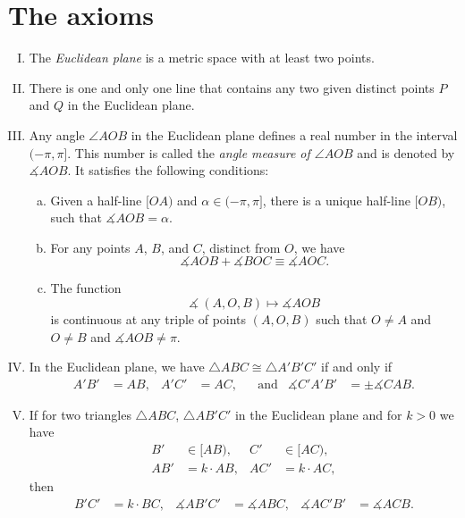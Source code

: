 \newpage

\section{The axioms}
\label{sec:axioms}


\begin{framed}
\begin{enumerate}[I.]
\item\label{def:birkhoff-axioms:0} The \emph{Euclidean plane} is a metric space with at least two points.


\item\label{def:birkhoff-axioms:1} 
There is one and only one line that contains any two given distinct points $P$ and $Q$ in the Euclidean plane.

\item\label{def:birkhoff-axioms:2} 
Any angle $\angle AOB$ in the Euclidean plane
defines a real number in the interval $(-\pi,\pi]$.
This number is called the \emph{angle measure of $\angle AOB$}
and is denoted by $\measuredangle A O B$.
It satisfies the following conditions:
\begin{enumerate}[(a)]
\item\label{def:birkhoff-axioms:2a} 
Given a half-line $[O A)$ and $\alpha\in(-\pi,\pi]$, 
there is a unique  half-line $[O B)$, 
such that $\measuredangle A O B= \alpha$.
\item\label{def:birkhoff-axioms:2b} 
For any points $A$, $B$, and $C$, distinct from $O$, we have
$$\measuredangle A O B+\measuredangle B O C
\equiv\measuredangle A O C.$$
\item\label{def:birkhoff-axioms:2c} 
The function 
$$\measuredangle\:(A,O,B)\mapsto\measuredangle A O B$$
is continuous at any triple of points $(A,O,B)$
such that $O\ne A$ and $O\ne B$ and $\measuredangle A O B\ne\pi$.

\end{enumerate}

\item\label{def:birkhoff-axioms:3}  
In the Euclidean plane, we have
$\triangle A B C\cong\triangle A' B' C'$
if and only if 
\begin{align*}
A' B'&=A B, & A' C'&= A C, &&\text{and}
&\measuredangle C' A' B'&=\pm\measuredangle C A B.
\end{align*}
\item\label{def:birkhoff-axioms:4}
If for two triangles $\triangle ABC$, $\triangle AB'C'$ in the Euclidean plane
and for $k>0$ we have
\begin{align*}
B'&\in [AB),
& C'&\in [AC),
\\
AB'&=k\cdot AB,&
AC'&=k\cdot AC,
\end{align*}
then
\begin{align*}
B'C'&=k\cdot BC,&
\measuredangle AB'C'&=\measuredangle ABC,
&
\measuredangle AC'B'&=\measuredangle ACB.
\end{align*}
\end{enumerate}
\end{framed}


